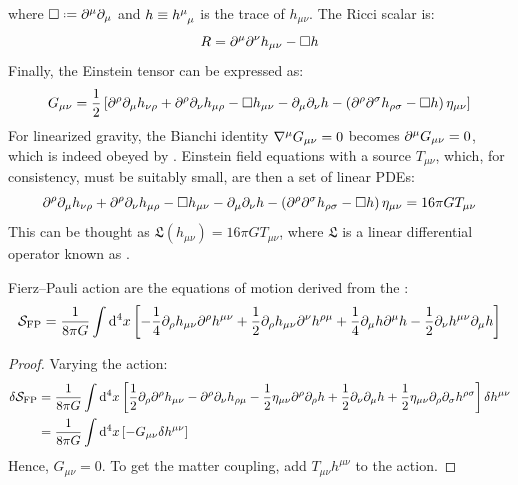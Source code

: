 where $ \dal \defeq \pa^\mu \pa_\mu $ and $ h \equiv \tensor{h}{^\mu_\mu} $ is the trace of $ h_{\mu \nu} $. The Ricci scalar is:
\begin{equation}
  R = \partial^\mu \partial^\nu h_{\mu \nu} - \Box h
\end{equation}
Finally, the Einstein tensor can be expressed as:
\begin{equation}
  G_{\mu \nu} = \frac{1}{2} \left[ \partial^\rho \partial_\mu h_{\nu \rho} + \partial^\rho \partial_\nu h_{\mu \rho} - \Box h_{\mu \nu} - \partial_\mu \partial_\nu h - \left( \partial^\rho \partial^\sigma h_{\rho \sigma} - \Box h \right) \eta_{\mu \nu} \right]
  \label{eq:weak-einst-tens}
\end{equation}
For linearized gravity, the Bianchi identity $ \nabla^\mu G_{\mu \nu} = 0 $ becomes $ \partial^\mu G_{\mu \nu} = 0 $, which is indeed obeyed by . Einstein field equations with a source $ T_{\mu \nu} $, which, for consistency, must be suitably small, are then a set of linear PDEs:
\begin{equation}
  \partial^\rho \partial_\mu h_{\nu \rho} + \partial^\rho \partial_\nu h_{\mu \rho} - \Box h_{\mu \nu} - \partial_\mu \partial_\nu h - \left( \partial^\rho \partial^\sigma h_{\rho \sigma} - \Box h \right) \eta_{\mu \nu} = 16\pi G T_{\mu \nu}
  \label{eq:weak-einst-feq}
\end{equation}
This can be thought as $ \mathfrak{L}(h_{\mu \nu}) = 16\pi G T_{\mu \nu} $, where $ \mathfrak{L} $ is a linear differential operator known as .

\begin{proposition}{Fierz--Pauli action}{}
   are the equations of motion derived from the :
  \begin{equation}
    \mathcal{S}_{\text{FP}} = \frac{1}{8\pi G} \int \mathrm{d}^4 x \left[ - \frac{1}{4} \partial_\rho h_{\mu \nu} \partial^\rho h^{\mu \nu} + \frac{1}{2} \partial_\rho h_{\mu \nu} \partial^\nu h^{\rho \mu} + \frac{1}{4} \partial_\mu h \partial^\mu h - \frac{1}{2} \partial_\nu h^{\mu \nu} \partial_\mu h \right]
    \label{eq:weak-pf-action}
  \end{equation}
\end{proposition}

\begin{proofbox}
  \begin{proof}
    Varying the action:
    \begin{equation*}
      \begin{split}
        \delta \mathcal{S}_{\text{FP}}
        &= \frac{1}{8\pi G} \int \mathrm{d}^4 x \left[ \frac{1}{2} \partial_\rho \partial^\rho h_{\mu \nu} - \partial^\rho \partial_\nu h_{\rho \mu} - \frac{1}{2} \eta_{\mu \nu} \partial^\rho \partial_\rho h + \frac{1}{2} \partial_\nu \partial_\mu h + \frac{1}{2} \eta_{\mu \nu} \partial_\rho \partial_\sigma h^{\rho \sigma} \right] \delta h^{\mu \nu} \\
        &= \frac{1}{8\pi G} \int \mathrm{d}^4 x \left[ - G_{\mu \nu} \delta h^{\mu \nu} \right]
      \end{split}
    \end{equation*}
    Hence, $ G_{\mu \nu} = 0 $. To get the matter coupling, add $ T_{\mu \nu} h^{\mu \nu} $ to the action.
  \end{proof}
\end{proofbox}

